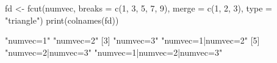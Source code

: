 \begin{Schunk}
% --begin: "fcut.merge2"
\begin{Sinput}
 fd <- fcut(numvec, breaks = c(1, 3, 5, 7, 9), merge = c(1, 2, 3), type = "triangle")
 print(colnames(fd))
\end{Sinput}
\begin{Soutput}
[1] "numvec=1"                   "numvec=2"                  
[3] "numvec=3"                   "numvec=1|numvec=2"         
[5] "numvec=2|numvec=3"          "numvec=1|numvec=2|numvec=3"
\end{Soutput}
%
% --end: "fcut.merge2"
\end{Schunk}

